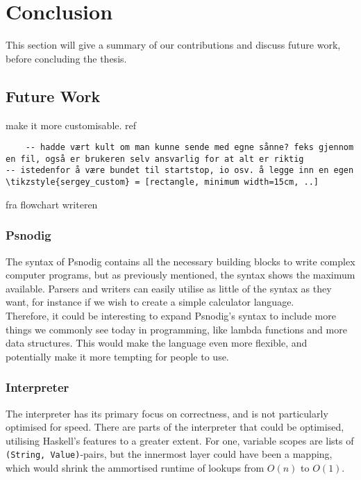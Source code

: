 \chapter{Conclusion}


This section will give a summary of our contributions and discuss future work, before concluding the thesis.

\section{Future Work}

make it more customisable. ref
\begin{verbatim}
    -- hadde vært kult om man kunne sende med egne sånne? feks gjennom en fil, også er brukeren selv ansvarlig for at alt er riktig
-- istedenfor å være bundet til startstop, io osv. å legge inn en egen \tikzstyle{sergey_custom} = [rectangle, minimum width=15cm, ..]
\end{verbatim}
fra flowchart writeren

\subsection{Psnodig}

The syntax of Psnodig contains all the necessary building blocks to write complex computer programs, but as previously mentioned, the syntax shows the maximum available. Parsers and writers can easily utilise as little of the syntax as they want, for instance if we wish to create a simple calculator language. \\

Therefore, it could be interesting to expand Psnodig's syntax to include more things we commonly see today in programming, like lambda functions and more data structures. This would make the language even more flexible, and potentially make it more tempting for people to use.


\subsection{Interpreter}

The interpreter has its primary focus on correctness, and is not particularly optimised for speed. There are parts of the interpreter that could be optimised, utilising Haskell's features to a greater extent. For one, variable scopes are lists of \texttt{(String, Value)}-pairs, but the innermost layer could have been a mapping, which would shrink the ammortised runtime of lookups from $O(n)$ to $O(1)$. \\

